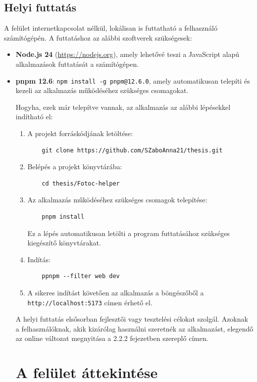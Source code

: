 \subsection{Helyi futtatás}
A felület internetkapcsolat nélkül, lokálisan is futtatható a felhasználó számítógépén.
A futtatáshoz az alábbi szoftverek szükségesek:
\begin{itemize}
  \item \textbf{Node.js 24} (\url{https://nodejs.org}), amely lehetővé teszi a JavaScript alapú alkalmazások futtatását a számítógépen. 
  \item \textbf{pnpm 12.6}: \texttt{npm install -g pnpm@12.6.0}, amely automatikusan telepíti és kezeli az alkalmazás működéséhez szükséges csomagokat.

Hogyha, ezek már telepítve vannak, az alkalmazás az alábbi lépésekkel indítható el:

\begin{enumerate}
  \item A projekt forráskódjának letöltése: 
  \begin{lstlisting} 
    git clone https://github.com/SZaboAnna21/thesis.git
  \end{lstlisting} 

  \item Belépés a projekt könyvtárába: 
  \begin{lstlisting} 
    cd thesis/Fotoc-helper
  \end{lstlisting} 
  \item Az alkalmazás működéséhez szükséges csomagok telepítése:
  \begin{lstlisting} 
    pnpm install
  \end{lstlisting} 
  Ez a lépés automatikusan letölti a program futtatásához szükséges kiegészítő könyvtárakat.
  \item Indítás: 
  \begin{lstlisting} 
    ppnpm --filter web dev
  \end{lstlisting}  
  \item A sikeres indítást követően az alkalmazás a böngészőből a \texttt{http://localhost:5173} címen érhető el.
\end{enumerate}

\mbox{}
A helyi futtatás elsősorban fejlesztői vagy tesztelési célokat szolgál. 
Azoknak a felhasználóknak, akik kizárólag használni szeretnék az alkalmazást, 
elegendő az online változat megnyitása a 2.2.2 fejezetben szereplő címen.

\section{A felület áttekintése}


\end{itemize}
